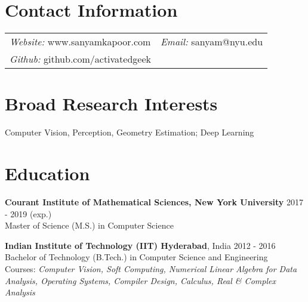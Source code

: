 \documentclass[margin,line]{res}
\begin{document}

\begin{resume}

\section{\sc Contact Information}

  \begin{tabular}{@{}p{2.9in}p{6in}}
	{\it Website:} www.sanyamkapoor.com & {\it Email:} sanyam@nyu.edu \\
	{\it Github:} github.com/activatedgeek  \\
  \end{tabular}

  \vspace*{-3.5mm}

\section{\sc Broad Research Interests}
  Computer Vision, Perception, Geometry Estimation; Deep Learning

\section{\sc Education}

  {\bf Courant Institute of Mathematical Sciences, New York University} \hfill 2017 - 2019 (exp.) \\
  	Master of Science (M.S.) in Computer Science

  \vspace*{-3.5mm}

  {\bf Indian Institute of Technology (IIT) Hyderabad}, India \hfill 2012 - 2016 \\
  	Bachelor of Technology (B.Tech.) in Computer Science and Engineering \\
    Courses: \it{Computer Vision, Soft Computing, Numerical Linear Algebra for Data Analysis, Operating Systems, Compiler Design, Calculus, Real \& Complex Analysis}

  \vspace*{-3.5mm}

  \begin{comment}
  {\bf La Montessori School}, Kullu, HP, India \hfill 2010 - 2012 \\
	Intermediate (Physics, Mathematics, Chemistry),
    Percentage Score: 93.4\% ({\bf Rank 1})


\end{comment}
\end{resume}
\end{document}
